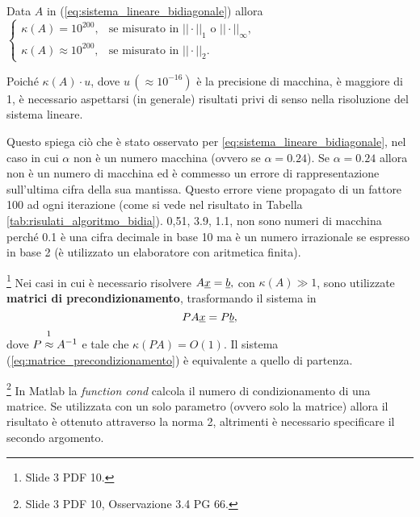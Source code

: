 \begin{example}
    Data $A$ in (\ref{eq:sistema_lineare_bidiagonale}) allora
    $\begin{cases}
         \kappa(A) = 10^{200}, &\text{se misurato in }||\cdot||_1\text{ o }||\cdot||_\infty,\\
         \kappa(A)\approx 10^{200}, &\text{se misurato in }||\cdot||_2.
    \end{cases}$

    Poiché $\kappa(A)\cdot u$, dove $u\,(\approx 10^{-16})$ è la precisione di macchina, è maggiore di 1, è necessario aspettarsi (in generale) risultati privi di senso nella risoluzione del sistema lineare.
    
    Questo spiega ciò che è stato osservato per \ref{eq:sistema_lineare_bidiagonale}, nel caso in cui $\alpha$ non è un numero macchina (ovvero se $\alpha=0.24$). Se $\alpha = 0.24$ allora non è un numero di macchina ed è commesso un errore di rappresentazione sull'ultima cifra della sua mantissa. Questo errore viene propagato di un fattore 100 ad ogni iterazione (come si vede nel risultato in Tabella \ref{tab:risulati_algoritmo_bidia}). 0,51, 3.9, 1.1, non sono numeri di macchina perché 0.1 è una cifra decimale in base 10 ma è un numero irrazionale se espresso in base 2 (è utilizzato un elaboratore con aritmetica finita).
\end{example}

\begin{remark}\footnote{Slide 3 PDF 10.}
    Nei casi in cui è necessario risolvere $A\uline x = \uline b,$ con $\kappa(A)\gg1$, sono utilizzate \textbf{matrici di precondizionamento}, trasformando il sistema in
    \begin{equation}\label{eq:matrice_precondizionamento}
        PA\uline x= P\uline b,
    \end{equation}
    dove $P\overset{\footnotemark}{\approx} A^{-1}$ e tale che $\kappa(PA)=O(1)$. Il sistema (\ref{eq:matrice_precondizionamento}) è equivalente a quello di partenza.
\end{remark}


\begin{remark}\footnote{Slide 3 PDF 10, Osservazione 3.4 PG 66.}
    In Matlab la \textit{function cond} calcola il numero di condizionamento di una matrice. Se utilizzata con un solo parametro (ovvero solo la matrice) allora il risultato è ottenuto attraverso la norma 2, altrimenti è necessario specificare il secondo argomento.
\end{remark}

